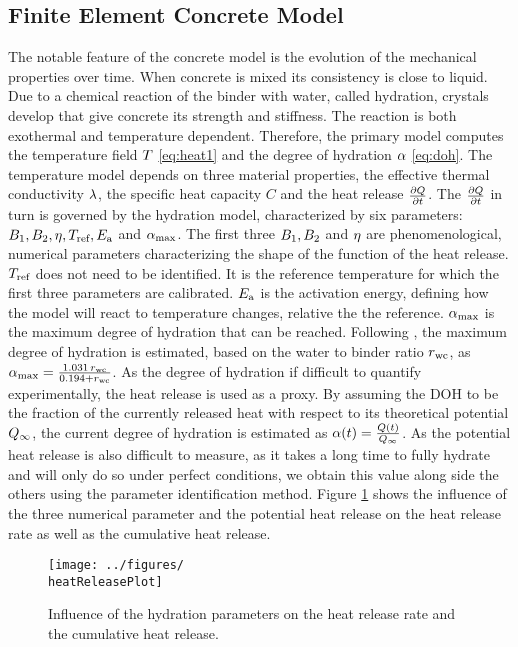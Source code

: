 \subsection{Finite Element Concrete Model}
The notable feature of the concrete model is the evolution of the mechanical properties over time.
When concrete is mixed its consistency is close to liquid.
Due to a chemical reaction of the binder with water, called hydration, crystals develop that give concrete its strength and stiffness.
The reaction is both exothermal and temperature dependent.
Therefore, the primary model computes the temperature field $T$ \eqref{eq:heat1} and the degree of hydration $\alpha$ \eqref{eq:doh}.
The temperature model depends on three material properties, the effective thermal conductivity $\lambda$, the specific heat capacity $C$ and the heat release $\frac{\partial Q}{\partial t}$.
The $\frac{\partial Q}{\partial t}$ in turn is governed by the hydration model, characterized by six parameters:
$B_1, B_2, \eta, T_{\text{ref}}, E_{\text{a}}$ and $\alpha_{\text{max}}$.
The first three $B_1, B_2$ and $\eta$ are phenomenological, numerical parameters characterizing the shape of the function of the heat release.
$T_{\text{ref}}$ does not need to be identified.
It is the reference temperature for which the first three parameters are calibrated.
$E_{\text{a}}$ is the activation energy, defining how the model will react to temperature changes, relative the the reference. 
$\alpha_{\text{max}}$ is the maximum degree of hydration that can be reached.
Following \cite{Mills1966fico}, the maximum degree of hydration is estimated, based on the water to binder ratio $r_{\text{wc}}$, as $\alpha_{\text{max}} = \frac{1.031\,r_{\text{wc}}}{0.194 + r_{\text{wc}}}$.
As the degree of hydration if difficult to quantify experimentally, the heat release is used as a proxy.
By assuming the DOH to be the fraction of the currently released heat with respect to its theoretical potential $Q_{\infty}$, the current degree of hydration is estimated as $\alpha(t) = \frac{Q(t)}{Q_{\infty}}$.
As the potential heat release is also difficult to measure, as it takes a long time to fully hydrate and will only do so under perfect conditions, we obtain this value along side the others using the parameter identification method.
Figure \ref{fig:heatrelease} shows the influence of the three numerical parameter and the potential heat release on the heat release rate as well as the cumulative heat release.
\begin{figure}[h]%
	\centering
	\texttt{[image: ../figures/\\heatReleasePlot]}
	\caption{Influence of the hydration parameters on the heat release rate and the cumulative heat release.}\label{fig:heatrelease}
\end{figure}
